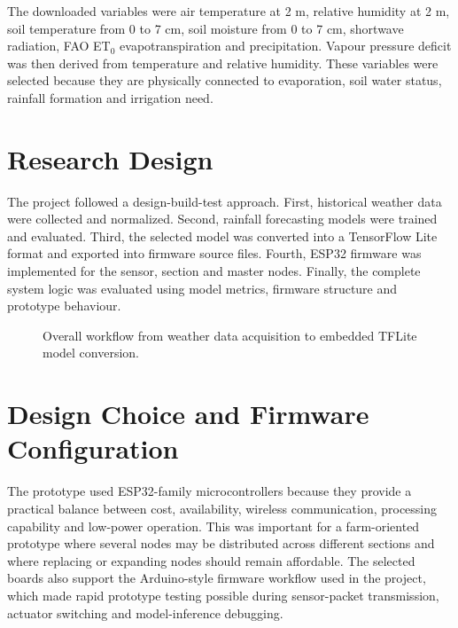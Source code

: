 \documentclass[12pt,a4paper]{report}
\begin{document}
The downloaded variables were air temperature at 2 m, relative humidity at 2 m, soil temperature from 0 to 7 cm, soil moisture from 0 to 7 cm, shortwave radiation, FAO ET$_0$ evapotranspiration and precipitation. Vapour pressure deficit was then derived from temperature and relative humidity. These variables were selected because they are physically connected to evaporation, soil water status, rainfall formation and irrigation need.

\section{Research Design}
The project followed a design-build-test approach. First, historical weather data were collected and normalized. Second, rainfall forecasting models were trained and evaluated. Third, the selected model was converted into a TensorFlow Lite format and exported into firmware source files. Fourth, ESP32 firmware was implemented for the sensor, section and master nodes. Finally, the complete system logic was evaluated using model metrics, firmware structure and prototype behaviour.

\begin{figure}[H]
	\centering
	\caption{Overall workflow from weather data acquisition to embedded TFLite model conversion.}
	\label{fig:workflow}
\end{figure}

\section{Design Choice and Firmware Configuration}
The prototype used ESP32-family microcontrollers because they provide a practical balance between cost, availability, wireless communication, processing capability and low-power operation. This was important for a farm-oriented prototype where several nodes may be distributed across different sections and where replacing or expanding nodes should remain affordable. The selected boards also support the Arduino-style firmware workflow used in the project, which made rapid prototype testing possible during sensor-packet transmission, actuator switching and model-inference debugging.
\end{document}
